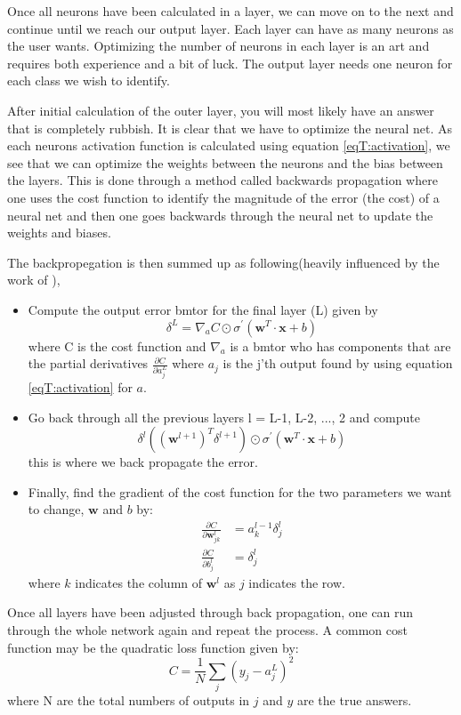 Once all neurons have been calculated in a layer, we can move on to the next and continue until we reach our output layer. Each layer can have as many neurons as the user wants. Optimizing the number of neurons in each layer is an art and requires both experience and a bit of luck. The output layer needs one neuron for each class we wish to identify.

After initial calculation of the outer layer, you will most likely have an answer that is completely rubbish. It is clear that we have to optimize the neural net. As each neurons activation function is calculated using equation \eqref{eqT:activation}, we see that we can optimize the weights between the neurons and the bias between the layers. This is done through a method called backwards propagation where one uses the cost function to identify the magnitude of the error (the cost) of a neural net and then one goes backwards through the neural net to update the weights and biases.

The backpropegation is then summed up as following(heavily influenced by the work of \citet{Nielsen}),
\begin{itemize}
    \item Compute the output error bmtor for the final layer (L) given by
    \begin{equation*}
        \delta^L = \nabla_a C \odot \sigma^{'}(\bm{w}^T \cdot \bm{x} + b)
    \end{equation*}
    where C is the cost function and $\nabla_a$ is a bmtor who has components that are the partial derivatives $\frac{\partial C}{\partial a_j^L}$ where $a_j$ is the j'th output found by using equation \eqref{eqT:activation} for $a$.
    \item Go back through all the previous layers l = L-1, L-2, ..., 2 and compute
    \begin{equation*}
        \delta^l ((\bm{w}^{l + 1})^T \delta^{l + 1}) \odot \sigma^{'}(\bm{w}^T \cdot \bm{x} + b)
    \end{equation*}
    this is where we back propagate the error.
    \item Finally, find the gradient of the cost function for the two parameters we want to change, $\bm{w}$ and $b$ by:
    \begin{align*}
        \frac{\partial C}{\partial \bm{w}_{jk}^l} &= a_k^{l-1}\delta_{j}^{l} \\
        \frac{\partial C}{\partial b_{j}^l} &= \delta_{j}^{l}
    \end{align*}
    where $k$ indicates the column of $\bm{w}^l$ as $j$ indicates the row.
\end{itemize}
Once all layers have been adjusted through back propagation, one can run through the whole network again and repeat the process. A common cost function may be the quadratic loss function given by:
\begin{equation}
    C = \frac{1}{N} \sum\limits_{j} (y_j - a_j^L)^2
\end{equation}
where N are the total numbers of outputs in $j$ and $y$ are the true answers.

